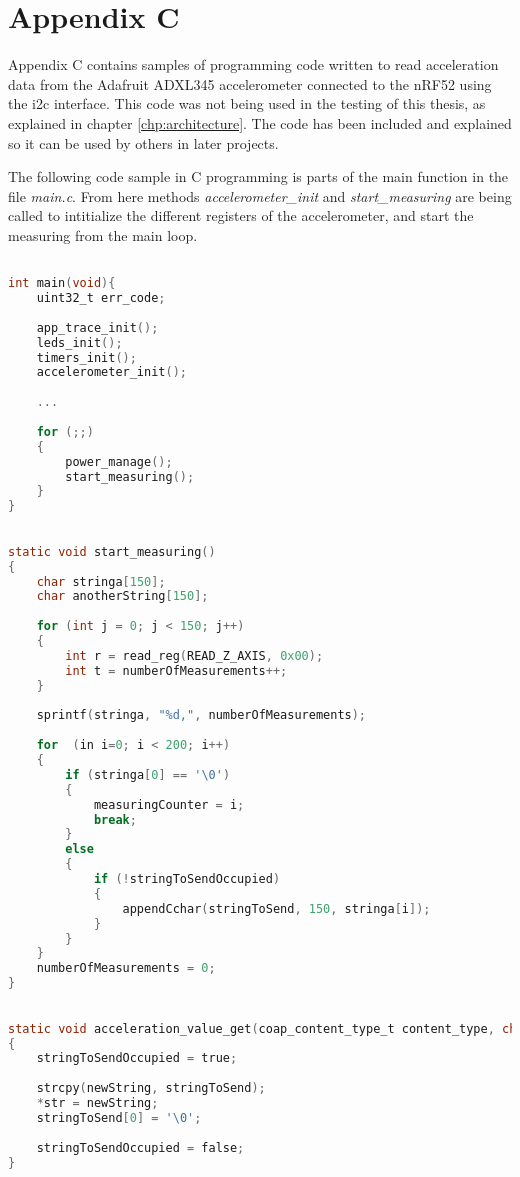 \chapter{Appendix C}
\label{chp:appendixc}

Appendix C contains samples of programming code written to read acceleration data from the Adafruit ADXL345 accelerometer connected to the nRF52 using the \gls{i2c} interface. This code was not being used in the testing of this thesis, as explained in chapter \ref{chp:architecture}. The code has been included and explained so it can be used by others in later projects.

The following code sample in C programming is parts of the main function in the file \textit{main.c}. From here methods \textit{accelerometer\_init} and \textit{start\_measuring} are being called to intitialize the different registers of the accelerometer, and start the measuring from the main loop. 

\begin{lstlisting}[language=C]

int main(void){
	uint32_t err_code; 
	
	app_trace_init(); 
	leds_init(); 
	timers_init();
	accelerometer_init(); 
	
	...
	
	for (;;)
	{
		power_manage();
		start_measuring();
	}
}
\end{lstlisting}

\newpage

\begin{lstlisting}[language=C]

static void start_measuring()
{
	char stringa[150];
	char anotherString[150];
	
	for (int j = 0; j < 150; j++)
	{	
		int r = read_reg(READ_Z_AXIS, 0x00);
		int t = numberOfMeasurements++;
	}
	
	sprintf(stringa, "%d,", numberOfMeasurements);
	
	for  (in i=0; i < 200; i++)
	{
		if (stringa[0] == '\0')
		{
			measuringCounter = i;
			break;
		}
		else
		{
			if (!stringToSendOccupied)
			{
				appendCchar(stringToSend, 150, stringa[i]);
			}
		}
	}
	numberOfMeasurements = 0; 
}

\end{lstlisting}


\begin{lstlisting}[language=C]

static void acceleration_value_get(coap_content_type_t content_type, char ** str)
{
	stringToSendOccupied = true; 
	
	strcpy(newString, stringToSend);
	*str = newString;
	stringToSend[0] = '\0';
	
	stringToSendOccupied = false; 
}


\end{lstlisting}